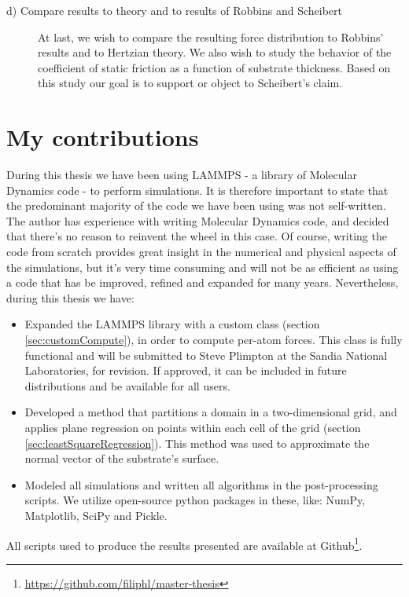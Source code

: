 \documentclass[twoside,english]{uiofysmaster}
\begin{document}
\begin{description}
	\item[d) Compare results to theory and to results of Robbins and Scheibert] \hfill %
	At last, we wish to compare the resulting force distribution to Robbins' results and to Hertzian theory. 
	We also wish to study the behavior of the coefficient of static friction as a function of substrate thickness. 
	Based on this study our goal is to support or object to Scheibert's claim. 
		
\end{description}
	
\section{My contributions}
During this thesis we have been using LAMMPS - a library of Molecular Dynamics code - to perform simulations. 
It is therefore important to state that the predominant majority of the code we have been using was not self-written.
The author has experience with writing Molecular Dynamics code, and decided that there's no reason to reinvent the wheel in this case. 
Of course, writing the code from scratch provides great insight in the numerical and physical aspects of the simulations, but it's very time consuming and will not be as efficient as using a code that has be improved, refined and expanded for many years.
Nevertheless, during this thesis we have:	
\begin{itemize}
\item Expanded the LAMMPS library with a custom class (section \ref{sec:customCompute}), in order to compute per-atom forces. 
This class is fully functional and will be submitted to Steve Plimpton at the Sandia National Laboratories, for revision. 
If approved, it can be included in future distributions and be available for all users. 

\item Developed a method that partitions a domain in a two-dimensional grid, and applies plane regression on points within each cell of the grid (section \ref{sec:leastSquareRegression}).  
This method was used to approximate the normal vector of the substrate's surface.

\item Modeled all simulations and written all algorithms in the post-processing scripts. 
We utilize open-source python packages in these, like: NumPy, Matplotlib, SciPy and Pickle.

\end{itemize}
\noindent
All scripts used to produce the results presented are available at Github\footnote{\href{https://github.com/filiphl/master-thesis}{\url{https://github.com/filiphl/master-thesis}}}.
\end{document}
